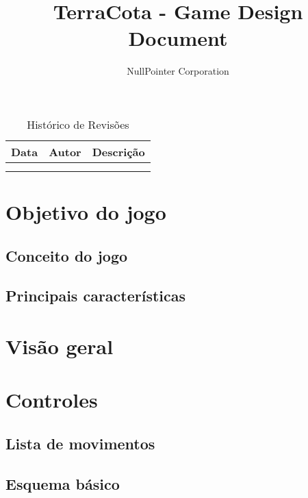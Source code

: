 \documentclass[12pt]{article}
\begin{document}
\title{TerraCota - Game Design Document}
\author{NullPointer Corporation}
\date{}
\maketitle

\newpage

\tableofcontents

\newpage

\begin{table}[h]
  \centering
  \begin{tabular}{cll}
    \toprule
    \textbf{Data} & \textbf{Autor} & \textbf{Descrição} \\
    \midrule
     &  &  \\
    \rowcolor[gray]{0.9}
    \bottomrule
  \end{tabular}
  \caption{Histórico de Revisões}
\end{table}


\newpage

\section{Objetivo do jogo}

\subsection{Conceito do jogo}

\subsection{Principais características}

\section{Visão geral}

\section{Controles}

\subsection{Lista de movimentos}

\subsection{Esquema básico}
\end{document}
